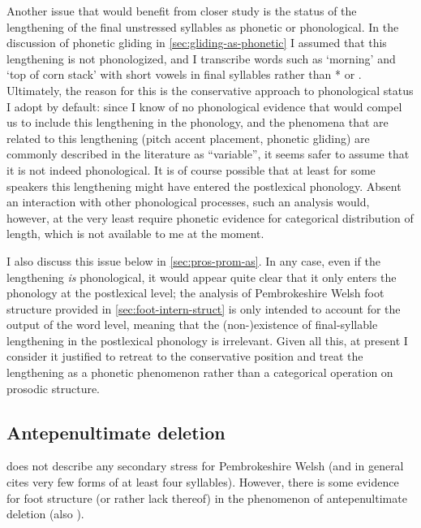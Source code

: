 Another issue that would benefit from closer study is the status of the lengthening of the final unstressed syllables as phonetic or phonological. In the discussion of phonetic gliding in \cref{sec:gliding-as-phonetic} I assumed that this lengthening is not phonologized, and I transcribe words such as \ipa{[boːre]} `morning' and \ipa{[ˈkopsi]} `top of corn stack' with short vowels in final syllables rather than *\ipa{[ˈboːreː]} or \ipa{[ˈkopsiː]}. Ultimately, the reason for this is the conservative approach to phonological status I adopt by default: since I know of no phonological evidence that would compel us to include this lengthening in the phonology, and the phenomena that are related to this lengthening (pitch accent placement, phonetic gliding) are commonly described in the literature as \enquote{variable}, it seems safer to assume that it is not indeed phonological. It is of course possible that at least for some speakers this lengthening might have entered the postlexical phonology. Absent an interaction with other phonological processes, such an analysis would, however, at the very least require phonetic evidence for categorical distribution of length, which is not available to me at the moment.

I also discuss this issue below in \cref{sec:pros-prom-as}. In any case, even if the lengthening \emph{is} phonological, it would appear quite clear that it only enters the phonology at the postlexical level; the analysis of Pembrokeshire Welsh foot structure provided in \cref{sec:foot-intern-struct} is only intended to account for the output of the word level, meaning that the (non-)existence of final\hyp syllable lengthening in the postlexical phonology is irrelevant. Given all this, at present I consider it justified to retreat to the conservative position and treat the lengthening as a phonetic phenomenon rather than a categorical operation on prosodic structure.

\subsection{Antepenultimate deletion}
\label{sec:antep-delet}

\citet{awbery86:_pembr_welsh} does not describe any secondary stress for Pembrokeshire Welsh (and in general cites very few forms of at least four syllables). However, there is some evidence for foot structure (or rather lack thereof) in the phenomenon of antepenultimate deletion (\cf also \citealt{jones49:_moder_welsh,watkins76:_cyfnew_gymraeg,hannahs11:_welsh}).

